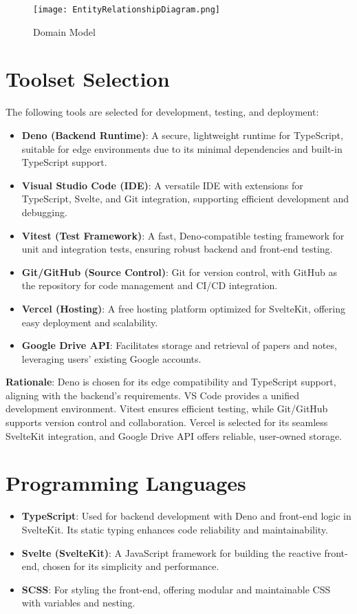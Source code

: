 \documentclass[12pt]{article}
\begin{document}
\begin{figure}
  \centering
  \texttt{[image: EntityRelationshipDiagram.png]}
  \caption{Domain Model}
  \label{fig:domainModel}
\end{figure}

\section{Toolset Selection}
The following tools are selected for development, testing, and deployment:

\begin{itemize}
  \item \textbf{Deno (Backend Runtime)}: A secure, lightweight runtime for TypeScript, suitable for edge environments due to its minimal dependencies and built-in TypeScript support.
  \item \textbf{Visual Studio Code (IDE)}: A versatile IDE with extensions for TypeScript, Svelte, and Git integration, supporting efficient development and debugging.
  \item \textbf{Vitest (Test Framework)}: A fast, Deno-compatible testing framework for unit and integration tests, ensuring robust backend and front-end testing.
  \item \textbf{Git/GitHub (Source Control)}: Git for version control, with GitHub as the repository for code management and CI/CD integration.
  \item \textbf{Vercel (Hosting)}: A free hosting platform optimized for SvelteKit, offering easy deployment and scalability.
  \item \textbf{Google Drive API}: Facilitates storage and retrieval of papers and notes, leveraging users' existing Google accounts.
\end{itemize}

\textbf{Rationale}: Deno is chosen for its edge compatibility and TypeScript support, aligning with the backend's requirements. VS Code provides a unified development environment. Vitest ensures efficient testing, while Git/GitHub supports version control and collaboration. Vercel is selected for its seamless SvelteKit integration, and Google Drive API offers reliable, user-owned storage.

\section{Programming Languages}
\begin{itemize}
  \item \textbf{TypeScript}: Used for backend development with Deno and front-end logic in SvelteKit. Its static typing enhances code reliability and maintainability.
  \item \textbf{Svelte (SvelteKit)}: A JavaScript framework for building the reactive front-end, chosen for its simplicity and performance.
  \item \textbf{SCSS}: For styling the front-end, offering modular and maintainable CSS with variables and nesting.
\end{itemize}
\end{document}

